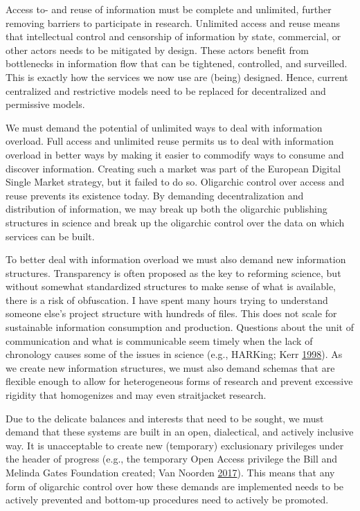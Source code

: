 \documentclass[a5paper]{book}
\begin{document}
Access to- and reuse of information must be complete and unlimited,
further removing barriers to participate in research. Unlimited access
and reuse means that intellectual control and censorship of information
by state, commercial, or other actors needs to be mitigated by design.
These actors benefit from bottlenecks in information flow that can be
tightened, controlled, and surveilled. This is exactly how the services
we now use are (being) designed. Hence, current centralized and
restrictive models need to be replaced for decentralized and permissive
models.

We must demand the potential of unlimited ways to deal with information
overload. Full access and unlimited reuse permits us to deal with
information overload in better ways by making it easier to commodify
ways to consume and discover information. Creating such a market was
part of the European Digital Single Market strategy, but it failed to do
so. Oligarchic control over access and reuse prevents its existence
today. By demanding decentralization and distribution of information, we
may break up both the oligarchic publishing structures in science and
break up the oligarchic control over the data on which services can be
built.

To better deal with information overload we must also demand new
information structures. Transparency is often proposed as the key to
reforming science, but without somewhat standardized structures to make
sense of what is available, there is a risk of obfuscation. I have spent
many hours trying to understand someone else's project structure with
hundreds of files. This does not scale for sustainable information
consumption and production. Questions about the unit of communication
and what is communicable seem timely when the lack of chronology causes
some of the issues in science (e.g., HARKing; Kerr
\protect\hyperlink{ref-doi:10.1207ux2fs15327957pspr0203_4}{1998}). As we
create new information structures, we must also demand schemas that are
flexible enough to allow for heterogeneous forms of research and prevent
excessive rigidity that homogenizes and may even straitjacket research.

Due to the delicate balances and interests that need to be sought, we
must demand that these systems are built in an open, dialectical, and
actively inclusive way. It is unacceptable to create new (temporary)
exclusionary privileges under the header of progress (e.g., the
temporary Open Access privilege the Bill and Melinda Gates Foundation
created; Van Noorden
\protect\hyperlink{ref-doi:10.1038ux2fnature.2017.21486}{2017}). This
means that any form of oligarchic control over how these demands are
implemented needs to be actively prevented and bottom-up procedures need
to actively be promoted.
\end{document}
